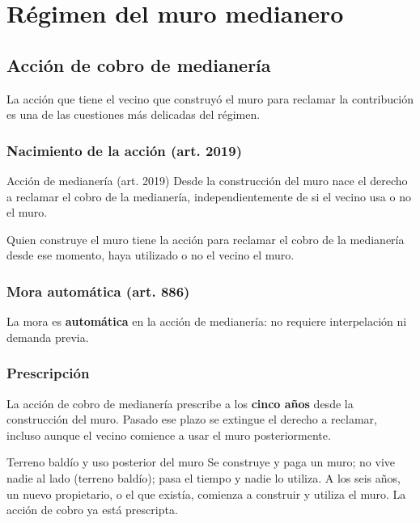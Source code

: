 \documentclass[12pt,oneside]{book}
\begin{document}
\chapter{Régimen del muro medianero}

\section{Acción de cobro de medianería}

La acción que tiene el vecino que construyó el muro para reclamar la contribución es una de las cuestiones más delicadas del régimen.

\subsection{Nacimiento de la acción (art. 2019)}

\begin{definition}{Acción de medianería (art. 2019)}
Desde la construcción del muro nace el derecho a reclamar el cobro de la medianería, independientemente de si el vecino usa o no el muro.
\end{definition}

Quien construye el muro tiene la acción para reclamar el cobro de la medianería desde ese momento, haya utilizado o no el vecino el muro.

\subsection{Mora automática (art. 886)}

La mora es \textbf{automática} en la acción de medianería: no requiere interpelación ni demanda previa.

\subsection{Prescripción}

\begin{important}
La acción de cobro de medianería prescribe a los \textbf{cinco años} desde la construcción del muro. Pasado ese plazo se extingue el derecho a reclamar, incluso aunque el vecino comience a usar el muro posteriormente.
\end{important}

\begin{example}{Terreno baldío y uso posterior del muro}
Se construye y paga un muro; no vive nadie al lado (terreno baldío); pasa el tiempo y nadie lo utiliza. A los seis años, un nuevo propietario, o el que existía, comienza a construir y utiliza el muro. La acción de cobro ya está prescripta.
\end{example}
\end{document}

